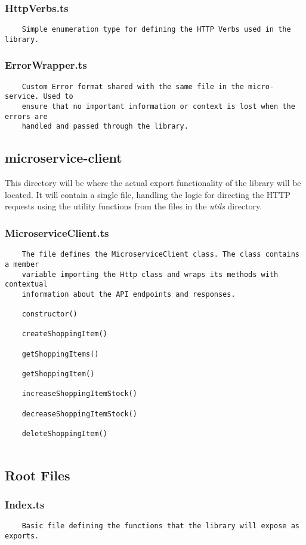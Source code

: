 \subsubsection{HttpVerbs.ts}
\begin{verbatim}
    Simple enumeration type for defining the HTTP Verbs used in the library.
\end{verbatim}
\subsubsection{ErrorWrapper.ts}
\begin{verbatim}
    Custom Error format shared with the same file in the micro-service. Used to
    ensure that no important information or context is lost when the errors are
    handled and passed through the library.
\end{verbatim}
\subsection{microservice-client}
This directory will be where the actual export functionality of the library will be located. It will contain a single file, handling the logic for directing the HTTP requests using the utility functions from the files in the \emph{utils} directory.
\subsubsection{MicroserviceClient.ts}
\begin{verbatim}
    The file defines the MicroserviceClient class. The class contains a member
    variable importing the Http class and wraps its methods with contextual
    information about the API endpoints and responses. 
    
    constructor()
    
    createShoppingItem()
    
    getShoppingItems()
    
    getShoppingItem()
    
    increaseShoppingItemStock()
    
    decreaseShoppingItemStock()
    
    deleteShoppingItem()
    
\end{verbatim}
\subsection{Root Files}
\subsubsection{Index.ts}
\begin{verbatim}
    Basic file defining the functions that the library will expose as exports.
\end{verbatim}
